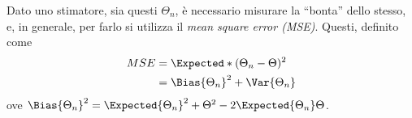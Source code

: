\documentclass{subfiles}
\begin{document}
Dato uno stimatore, sia questi \(\Theta_{n}\), è necessario misurare la ``bonta'' dello stesso,
e, in generale, per farlo si utilizza il \emph{mean square error (MSE)}.
Questi, definito come
\[\begin{aligned}
        MSE & = \Expected*{(\Theta_{n} - \Theta)^{2}}    \\
            & = \Bias{\Theta_{n}}^{2} + \Var{\Theta_{n}} \\
    \end{aligned}\]
ove \(\Bias{\Theta_{n}}^{2} = \Expected{\Theta_{n}}^{2} + \Theta^{2} - 2 \Expected{\Theta_{n}}\Theta\).
\end{document}
